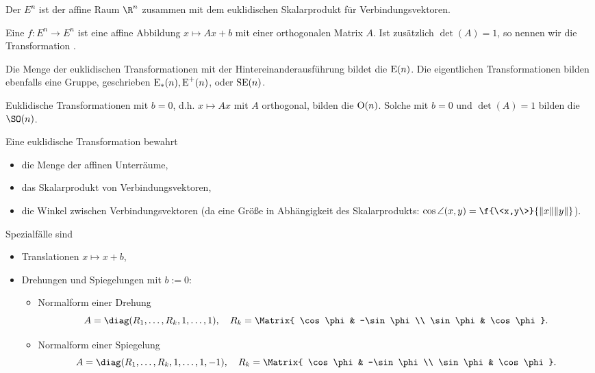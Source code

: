 \begin{df}
	Der  $E^n$ ist der affine Raum $\R^n$ zusammen mit dem euklidischen Skalarprodukt für Verbindungsvektoren.

	Eine  $f: E^n \to E^n$  ist eine affine Abbildung $x \mapsto Ax + b$ mit einer orthogonalen Matrix $A$.
	Ist zusätzlich $\det(A) = 1$, so nennen wir die Transformation .

	Die Menge der euklidischen Transformationen mit der Hintereinanderausführung bildet die  $\operatorname{E}(n)$.
	Die eigentlichen Transformationen bilden ebenfalls eine Gruppe, geschrieben $\operatorname{E}_*(n), \operatorname{E}^+(n)$, oder $\operatorname{SE}(n)$.

	Euklidische Transformationen mit $b = 0$, d.h. $x \mapsto Ax$ mit $A$ orthogonal, bilden die  $\operatorname{O}(n)$.
	Solche mit $b = 0$ und $\det(A) = 1$ bilden die  $\SO(n)$.
\end{df}

\begin{nt}
	Eine euklidische Transformation bewahrt
	\begin{itemize}
		\item
			die Menge der affinen Unterräume,
		\item
			das Skalarprodukt von Verbindungsvektoren,
		\item
			die Winkel zwischen Verbindungsvektoren (da eine Größe in Abhängigkeit des Skalarprodukts: $\cos \angle (x,y) = \f {\<x,y\>}{\|x\|\|y\|}$).
	\end{itemize}
	Spezialfälle sind
	\begin{itemize}
		\item
			Translationen $x \mapsto x + b$,
		\item
			Drehungen und Spiegelungen mit $b := 0$:
			\begin{itemize}
				\item
					Normalform einer Drehung
					\[
						A = \diag(R_1, \dotsc, R_k, 1, \dotsc, 1),
						\quad
						R_k = \Matrix{
							\cos \phi & -\sin \phi \\
							\sin \phi & \cos \phi
						}.
					\]
				\item
					Normalform einer Spiegelung
					\[
						A = \diag(R_1, \dotsc, R_k, 1, \dotsc, 1, -1),
						\quad
						R_k = \Matrix{
							\cos \phi & -\sin \phi \\
							\sin \phi & \cos \phi
						}.
					\]
			\end{itemize}
	\end{itemize}
\end{nt}

